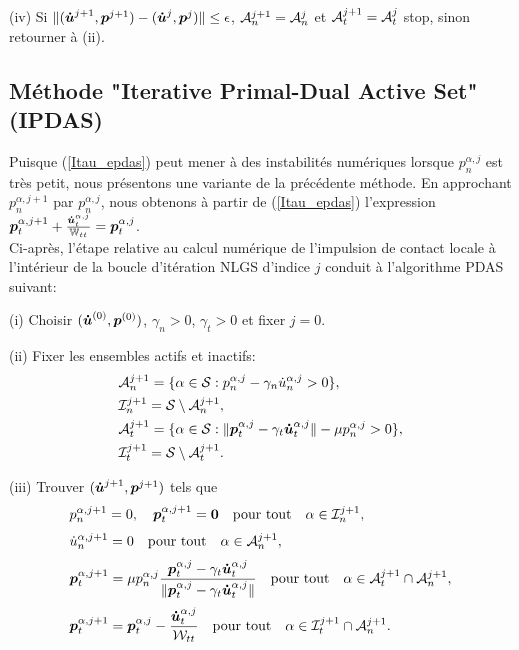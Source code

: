 \qquad(iv) Si $\|(\boldsymbol{\dot{u}}^{ j+1},\boldsymbol{p}^{ j+1})-(\boldsymbol{\dot{u}}^{ j},\boldsymbol{p}^{ j})\|\leq\epsilon$, ${\cal A}_{n}^{j+1}={\cal A}_{n}^{j}$ et ${\cal A}_{t}^{j+1}={\cal A}_{t}^{j}$ stop, sinon retourner à (ii).

\subsection{Méthode "Iterative Primal-Dual Active Set"  (IPDAS)}\label{ipdas}
Puisque (\ref{Itau_epdas}) peut mener à des instabilités numériques lorsque $p^{\alpha,j}_n$ est très petit, nous présentons une variante de la précédente méthode. En approchant $p^{\alpha,j+1}_n$ par $p^{\alpha,j}_n$, nous obtenons à partir de (\ref{Itau_epdas}) l'expression $\boldsymbol{p}_{t}^{\alpha,j+1} + \frac{\boldsymbol{\dot{u}}^{\alpha,j}_t}{\mathbb{W}_{tt}} = \boldsymbol{p}_{t}^{\alpha,j}$.\\
Ci-après, l'étape relative au calcul numérique de l'impulsion de contact locale à l'intérieur de la boucle d'itération NLGS d'indice $ j $ conduit à l'algorithme PDAS suivant:
 
 \qquad(i) Choisir $(\boldsymbol{\dot{u}}^{(0)},\boldsymbol{p}^{(0)})$, $\gamma_{n}>0$, $\gamma_{t}>0$ et fixer $j=0$.
 
\qquad(ii) Fixer les ensembles actifs et inactifs:
\begin{align*}
&{\cal A}_{n}^{j+1}=\{\alpha\in {\cal S}:p^{\alpha,j}_n - \gamma_n \dot{u}^{\alpha,j}_n > 0\},\\
&{\cal I}_{n}^{j+1}={\cal S}\setminus {\cal A}_{n}^{j+1},\\
&{\cal A}_{t}^{j+1}=\{\alpha\in {\cal S}:\|\boldsymbol{p}^{\alpha,j}_t - \gamma_t \boldsymbol{\dot{u}}^{\alpha,j}_t\| - \mu p^{\alpha,j}_n > 0\},\\
&{\cal I}_{t}^{j+1}={\cal S}\setminus {\cal A}_{t}^{j+1}.
\end{align*}

\qquad(iii) Trouver $(\boldsymbol{\dot{u}}^{j+1 },\boldsymbol{p}^{j+1 })$ tels que
\begin{eqnarray}
&\label{Inu_ipdas}p^{\alpha,j+1}_{n}=0, \quad \boldsymbol{p}^{\alpha,j+1}_{t}=\mbox{\boldmath{$0$}} \quad {\rm pour \ tout} \quad \alpha\in {\cal I}_{n}^{j+1},\\[1mm]
&\label{Anu_ipdas}\dot{u}^{\alpha,j+1}_{n}=0 \quad {\rm pour \ tout} \quad \alpha \in {\cal A}_{n}^{j+1},\\[1mm]
&\label{Atau_ipdas}\boldsymbol{p}_{t}^{\alpha,j+1} =\mu p^{\alpha,j}_n \frac{\boldsymbol{p}^{\alpha,j}_t - \gamma_t \boldsymbol{\dot{u}}^{\alpha,j}_t}{\|\boldsymbol{p}^{\alpha,j}_t - \gamma_t \boldsymbol{\dot{u}}^{\alpha,j}_t\|} \quad {\rm pour \ tout} \quad \alpha \in {\cal A}_{t}^{j+1}\cap {\cal A}_{n}^{j+1},\\[1mm]
&\label{Itau_ipdas}\boldsymbol{p}_{t}^{\alpha,j+1} = \boldsymbol{p}_{t}^{\alpha,j} - \frac{\boldsymbol{\dot{u}}^{\alpha,j}_t}{{\cal W}_{tt}} \quad {\rm pour \ tout} \quad \alpha \in {\cal I}_{t}^{j+1}\cap {\cal A}_{n}^{j+1}.
\end{eqnarray}

